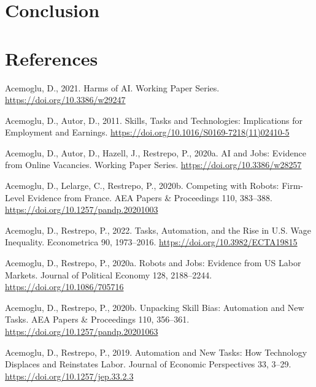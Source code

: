 \documentclass[
  11,
  a4paperpaper,
]{article}
\newlength{\cslhangindent}
\newenvironment{CSLReferences}[2] %
 {\begin{list}{}{%
  \setlength{\itemindent}{0pt}
  \setlength{\leftmargin}{0pt}
  \setlength{\parsep}{0pt}
  \ifodd #1
   \setlength{\leftmargin}{\cslhangindent}
   \setlength{\itemindent}{-1\cslhangindent}
  \fi
  \setlength{\itemsep}{#2\baselineskip}}}
 {\end{list}}
\let\oldsection\section
\renewcommand\section{\clearpage\oldsection}
\begin{document}
\section{Conclusion}\label{conclusion}

\newpage{}

\section*{References}\label{sec-references}

\label{refs}
\begin{CSLReferences}{1}{0}
Acemoglu, D., 2021. Harms of {AI}. Working {Paper} {Series}.
\url{https://doi.org/10.3386/w29247}

Acemoglu, D., Autor, D., 2011. Skills, {Tasks} and {Technologies}:
{Implications} for {Employment} and {Earnings}.
\url{https://doi.org/10.1016/S0169-7218(11)02410-5}

Acemoglu, D., Autor, D., Hazell, J., Restrepo, P., 2020a. {AI} and
{Jobs}: {Evidence} from {Online} {Vacancies}. Working {Paper} {Series}.
\url{https://doi.org/10.3386/w28257}

Acemoglu, D., Lelarge, C., Restrepo, P., 2020b. Competing with {Robots}:
{Firm}-{Level} {Evidence} from {France}. AEA Papers \& Proceedings 110,
383--388. \url{https://doi.org/10.1257/pandp.20201003}

Acemoglu, D., Restrepo, P., 2022. Tasks, {Automation}, and the {Rise} in
{U}.{S}. {Wage} {Inequality}. Econometrica 90, 1973--2016.
\url{https://doi.org/10.3982/ECTA19815}

Acemoglu, D., Restrepo, P., 2020a. Robots and {Jobs}: {Evidence} from
{US} {Labor} {Markets}. Journal of Political Economy 128, 2188--2244.
\url{https://doi.org/10.1086/705716}

Acemoglu, D., Restrepo, P., 2020b. Unpacking {Skill} {Bias}:
{Automation} and {New} {Tasks}. AEA Papers \& Proceedings 110, 356--361.
\url{https://doi.org/10.1257/pandp.20201063}

Acemoglu, D., Restrepo, P., 2019. Automation and {New} {Tasks}: {How}
{Technology} {Displaces} and {Reinstates} {Labor}. Journal of Economic
Perspectives 33, 3--29. \url{https://doi.org/10.1257/jep.33.2.3}


\end{CSLReferences}
\end{document}

